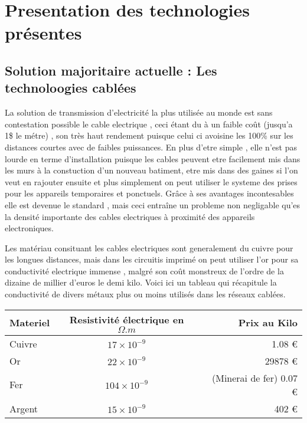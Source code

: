 \documentclass[11pt]{report}
\begin{document}
\section{Presentation des technologies présentes}
\subsection{Solution majoritaire actuelle : Les technoloogies cablées}
	La solution de transmission d'electricité la plus utilisée au monde est sans contestation possible le cable electrique , ceci étant du à un faible coût (jusqu'a 1\$ le métre) , son très haut rendement puisque celui ci avoisine les 100\% sur les distances courtes avec de faibles puissances. En plus d'etre simple , elle n'est pas lourde en terme d'installation puisque les cables peuvent etre facilement mis dans les murs à la constuction d'un nouveau batiment, etre mis dans des gaines si l'on veut en rajouter ensuite et plus simplement on peut utiliser le systeme des prises pour les appareils temporaires et ponctuels. Grâce à ses avantages incontesables elle est devenue le standard , mais ceci entraîne un probleme non negligable qu'es la densité importante des cables electriques à proximité des appareils electroniques. %
	
	Les matériau consituant les cables electriques sont generalement du cuivre pour les longues distances, mais dans les circuitis imprimé on peut utiliser l'or pour sa conductivité electrique immense , malgré son coût monstreux de l'ordre de la dizaine de millier d'euros le demi kilo. Voici ici un tableau qui récapitule la conductivité de divers métaux plus ou moins utilisés dans les réseaux cablées.

\begin{center}
\begin{tabular}{| l | c | r |}
	\hline
	Materiel & Resistivité électrique en \( \Omega .m \) & Prix au Kilo \\
	\hline
	Cuivre & \(17 \times 10^{-9} \) & 1.08 \euro{}  \\
	Or & \(22 \times 10^{-9} \) & 29878 \euro{}  \\
	Fer & \(104 \times 10^{-9}\) & (Minerai de fer) 0.07 \euro{}  \\
	Argent & \(15 \times 10^{-9}\) & 402 \euro{}  \\
	\hline
\end{tabular}
\end{center}
\end{document}
